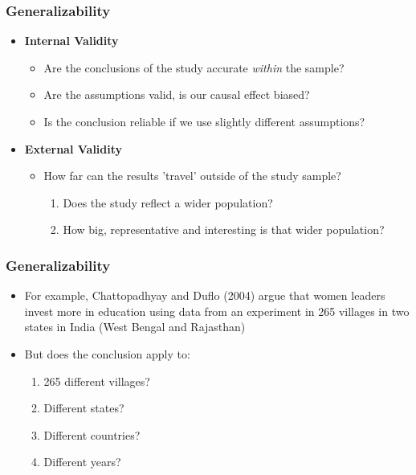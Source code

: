 \documentclass[xcolor=x11names,compress]{beamer}\usepackage[]{graphicx}\usepackage[]{color}
\renewcommand{\(}{\begin{columns}}
\renewcommand{\)}{\end{columns}}
\newcommand{\<}[1]{\begin{column}{#1}}
\renewcommand{\>}{\end{column}}
\begin{document}
\begin{frame}
\frametitle{Generalizability}
\begin{itemize}
\item \textbf{Internal Validity}
\begin{itemize}
\item Are the conclusions of the study accurate \textit{within} the sample?
\pause
\item Are the assumptions valid, is our causal effect biased?
\pause
\item Is the conclusion reliable if we use slightly different assumptions?
\pause
\end{itemize}
\item \textbf{External Validity}
\begin{itemize}
\item How far can the results 'travel' outside of the study sample?
\pause
\begin{enumerate}
\item Does the study reflect a wider population?
\pause
\item How big, representative and interesting is that wider population?
\end{enumerate}
\end{itemize}
\end{itemize}
\end{frame}

\begin{frame}
\frametitle{Generalizability}
\begin{itemize}
\item For example, Chattopadhyay and Duflo (2004) argue that women leaders invest more in education using data from an experiment in 265 villages in two states in India (West Bengal and Rajasthan)
\pause
\item But does the conclusion apply to:
\pause
\begin{enumerate}
\item 265 different villages?
\pause
\item Different states?
\pause
\item Different countries?
\pause
\item Different years?
\end{enumerate}
\end{itemize}
\end{frame}
\end{document}

